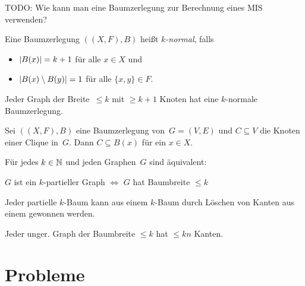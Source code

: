 \documentclass{cheat-sheet}
\newcommand{\size}[1]{\abs{#1}} %
\begin{document}

TODO: Wie kann man eine Baumzerlegung zur Berechnung eines MIS verwenden?

\begin{defn}
  Eine Baumzerlegung $((X, F), B)$ heißt \emph{$k$-normal}, falls
  \begin{itemize}
    \item $\size{B(x)} = k + 1$ für alle $x \in X$ und
    \item $\size{B(x) \setminus B(y)} = 1$ für alle $\{ x, y \} \in F$.
  \end{itemize}
\end{defn}

\begin{lem}
  Jeder Graph der Breite~$\leq k$ mit $\geq k + 1$ Knoten hat eine $k$-normale Baumzerlegung.
\end{lem}



\begin{lem}
  Sei $((X,F), B)$ eine Baumzerlegung von~$G = (V, E)$ und $C \subseteq V$ die Knoten einer Clique in~$G$.
  Dann $C \subseteq B(x)$ für ein $x \in X$.
\end{lem}

\begin{satz}
  Für jedes $k \in \mathbb{N}$ und jeden Graphen~$G$ sind äquivalent:
  \begin{center}
    $G$ ist ein $k$-partieller Graph $\iff$ $G$ hat Baumbreite $\leq k$
  \end{center}
\end{satz}

\begin{lem}
  Jeder partielle $k$-Baum kann aus einem $k$-Baum durch Löschen von Kanten aus einem gewonnen werden.
\end{lem}

\begin{lem}
  Jeder unger. Graph der Baumbreite $\leq k$ hat $\leq k n$ Kanten.
\end{lem}

\section{Probleme}
\end{document}
